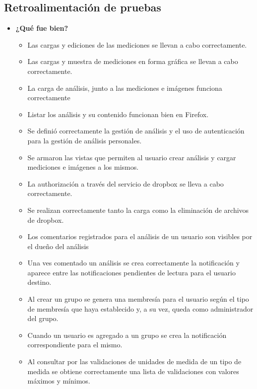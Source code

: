  \subsection{Retroalimentación de pruebas}
 	\begin{itemize}
 		\item \textbf{¿Qué fue bien?}
 		\begin{itemize}
 			\item        Las cargas y ediciones de las mediciones se llevan a cabo correctamente.		
			\item        Las cargas y muestra de mediciones en forma gráfica se llevan a cabo correctamente.			
			\item La carga de análisis, junto a las mediciones e imágenes funciona correctamente
			\item Listar los análisis y su contenido funcionan bien en Firefox.
			\item Se definió correctamente la gestión de análisis y el uso de autenticación para la gestión de análisis personales.
			\item Se armaron las vistas que permiten al usuario crear análisis y cargar mediciones e imágenes a los mismos.			
			\item La authorización a través del servicio de dropbox se lleva a cabo correctamente.
			\item Se realizan correctamente tanto la carga como la eliminación de archivos de dropbox.	
			\item  Los comentarios registrados para el análisis de un usuario son visibles por el dueño del análisis
			\item Una ves comentado un análisis se crea correctamente la notificación y aparece entre las notificaciones pendientes de lectura para el usuario destino.
			\item Al crear un grupo se genera una membresía para el usuario según el tipo de membresía que haya establecido y, a su vez, queda como administrador del grupo. 
			\item Cuando un usuario es agregado a un grupo se crea la notificación correspondiente para el mismo.
			\item Al consultar por las validaciones de unidades de medida de un tipo de medida se obtiene correctamente una lista de validaciones con valores máximos y mínimos.		
 		\end{itemize}
 		

\end{itemize}
